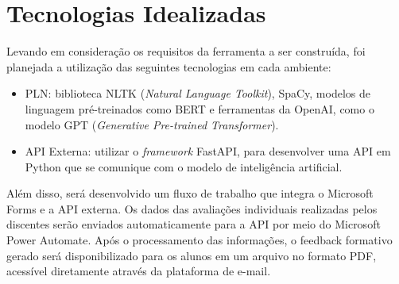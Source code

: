 \section{Tecnologias Idealizadas}

Levando em consideração os requisitos da ferramenta a ser construída, foi planejada a utilização das seguintes tecnologias em cada ambiente:

\begin{itemize}
  \item PLN: biblioteca NLTK (\textit{Natural Language Toolkit}), SpaCy, modelos de linguagem pré-treinados como BERT e ferramentas da OpenAI, como o modelo GPT (\textit{Generative Pre-trained Transformer}).
  \item API Externa: utilizar o \textit{framework} FastAPI, para desenvolver uma API em Python que se comunique com o modelo de inteligência artificial.
\end{itemize}

Além disso, será desenvolvido um fluxo de trabalho que integra o Microsoft Forms e a API externa. Os dados das avaliações individuais realizadas pelos discentes serão enviados automaticamente para a API por meio do Microsoft Power Automate. Após o processamento das informações, o feedback formativo gerado será disponibilizado para os alunos em um arquivo no formato PDF, acessível diretamente através da plataforma de e-mail.